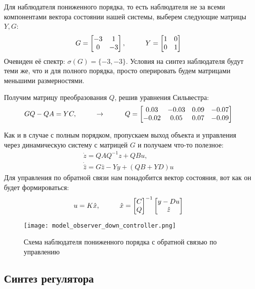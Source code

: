 Для наблюдателя пониженного порядка, то есть наблюдателя не за всеми компонентами вектора состоянии нашей системы, выберем следующие матрицы $Y, G$:
$$
  G = \begin{bmatrix}
    -3 & 1 \\
     0 & -3 
  \end{bmatrix}, \hspace*{1cm}
  Y = \begin{bmatrix}
    1 & 0 \\
    0 & 1
  \end{bmatrix}
$$
Очевиден её спектр: $\sigma(G) = \{-3, -3\}$. Условия на синтез наблюдателя будут теми же, что и для полного порядка, просто оперировать будем матрицами меньшими размерностями.

Получим матрицу преобразования $Q$, решив уравнения Сильвестра:
$$
  GQ - QA = YC, \hspace*{1cm} \rightarrow \hspace*{1cm} Q = \begin{bmatrix}
    0.03 &  -0.03  &  0.09  & -0.07 \\
   -0.02 &   0.05  &  0.07  & -0.09
  \end{bmatrix}
$$

Как и в случае с полным порядком, пропускаем выход объекта и управления через динамическую систему с матрицей $G$ и получаем что-то полезное:
$$
  \begin{aligned}
    \dot{z} = QAQ^{-1}z + QBu, \\
    \dot{\hat{z}} = G\hat{z} - Yy + (QB+YD)u
  \end{aligned}
$$
Для управления по обратной связи нам понадобится вектор состояния, вот как он будет формироваться:
$$
    u = K\hat{x}, \hspace*{1cm} \hat{x} = \begin{bmatrix}
                        C\\Q
                      \end{bmatrix}^{-1} \begin{bmatrix}
                        y - Du \\ \hat{z}
                      \end{bmatrix}
$$

\begin{figure}[ht]
  \centering
  \texttt{[image: model\_observer\_down\_controller.png]}
  \caption{Схема наблюдателя пониженного порядка с обратной связью по управлению}
\end{figure}

\newpage
\subsection{Синтез регулятора}

